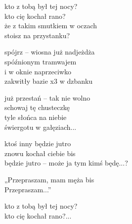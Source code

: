 \begin{text}
    \hfill\break
    \hfill\break
    kto z tobą był tej nocy?\\
    kto cię kochał rano?\\
    że z takim smutkiem w oczach\\
    stoisz na przystanku?

    spójrz – wiosna już nadjeżdża\\
    spóźnionym tramwajem\\
    i w oknie naprzeciwko\\
    zakwitły bazie x3 w dzbanku

    już przestań – tak nie wolno\\
    schowaj tę chusteczkę\\
    tyle słońca na niebie\\
    świergotu w gałęziach...

    ktoś inny będzie jutro\\
    znowu kochał ciebie bis\\
    będzie jutro – może ja tym kimś będę...?

    „Przepraszam, mam męża bis\\
     Przepraszam...”

    kto z tobą był tej nocy?\\
    kto cię kochał rano?...
\end{text}
